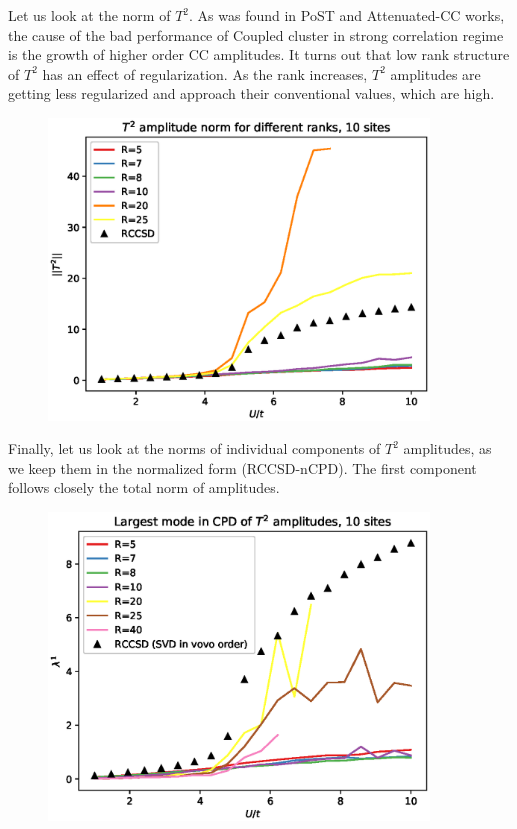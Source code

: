 \documentclass[a4paper,10pt]{article}
\begin{document}
Let us look at the norm of $T^{2}$.
As was found in PoST and Attenuated-CC works, the cause of the bad performance
of Coupled cluster in strong correlation regime is the growth of higher order
CC amplitudes. It turns out that low rank structure of $T^{2}$ has an effect of 
regularization. As the rank increases, $T^{2}$ amplitudes are getting less regularized 
and approach their conventional values, which are high.

\begin{figure}[!htb]
\centering
\includegraphics[width=0.9\textwidth]{figures/t2_norms_vs_u_10_sites.eps}
\end{figure}


Finally, let us look at the norms of individual components of $T^{2}$ amplitudes, 
as we keep them in the normalized form (RCCSD-nCPD). The first component 
follows closely the total norm of amplitudes.

\begin{figure}[!htb]
\centering
\includegraphics[width=0.9\textwidth]{figures/lam1_vs_u_10_sites.eps}
\end{figure}
\end{document}
